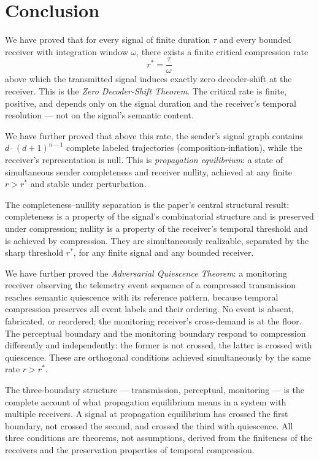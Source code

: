 \documentclass[twocolumn,11pt,a4paper]{article}
\theoremstyle{main}
\theoremstyle{definition}
\theoremstyle{remark}
\newcommand{\rate}{r}
\newcommand{\window}{\omega}
\begin{document}
\section{Conclusion}
\label{sec:conclusion}

We have proved that for every signal of finite duration $\tau$ and every
bounded receiver with integration window $\window$, there exists a finite
critical compression rate
\[
  \boxed{\rate^* = \frac{\tau}{\window}}
\]
above which the transmitted signal induces exactly zero decoder-shift
at the receiver. This is the \emph{Zero Decoder-Shift Theorem}. The
critical rate is finite, positive, and depends only on the signal
duration and the receiver's temporal resolution --- not on the signal's
semantic content.

We have further proved that above this rate, the sender's signal graph
contains $d \cdot (d+1)^{n-1}$ complete labeled trajectories
(composition-inflation), while the receiver's representation is null.
This is \emph{propagation equilibrium}: a state of simultaneous sender
completeness and receiver nullity, achieved at any finite $\rate >
\rate^*$ and stable under perturbation.

The completeness--nullity separation is the paper's central structural
result: completeness is a property of the signal's combinatorial
structure and is preserved under compression; nullity is a property of
the receiver's temporal threshold and is achieved by compression. They
are simultaneously realizable, separated by the sharp threshold
$\rate^*$, for any finite signal and any bounded receiver.

We have further proved the \emph{Adversarial Quiescence Theorem}: a
monitoring receiver observing the telemetry event sequence of a
compressed transmission reaches semantic quiescence with its reference
pattern, because temporal compression preserves all event labels and
their ordering. No event is absent, fabricated, or reordered; the
monitoring receiver's cross-demand is at the floor. The perceptual
boundary and the monitoring boundary respond to compression
differently and independently: the former is not crossed, the latter
is crossed with quiescence. These are orthogonal conditions achieved
simultaneously by the same rate $\rate > \rate^*$.

The three-boundary structure --- transmission, perceptual, monitoring
--- is the complete account of what propagation equilibrium means in
a system with multiple receivers. A signal at propagation equilibrium
has crossed the first boundary, not crossed the second, and crossed
the third with quiescence. All three conditions are theorems, not
assumptions, derived from the finiteness of the receivers and the
preservation properties of temporal compression.




\end{document}
